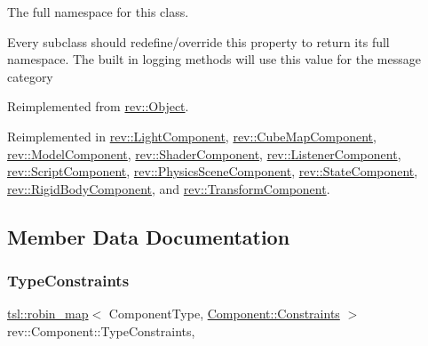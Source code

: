 The full namespace for this class. 

Every subclass should redefine/override this property to return its full namespace. The built in logging methods will use this value for the message category 

Reimplemented from \mbox{\hyperlink{classrev_1_1_object_aaeb638d3e10f361c56c211a318a27f3d}{rev\+::\+Object}}.



Reimplemented in \mbox{\hyperlink{classrev_1_1_light_component_a517a3334919e5cd1aeacdd52c65c90c1}{rev\+::\+Light\+Component}}, \mbox{\hyperlink{classrev_1_1_cube_map_component_a5fd0d5b47d8ba3594d4daf0ed8135b83}{rev\+::\+Cube\+Map\+Component}}, \mbox{\hyperlink{classrev_1_1_model_component_ad55fe767e54742f08b338f0f13498cf8}{rev\+::\+Model\+Component}}, \mbox{\hyperlink{classrev_1_1_shader_component_ac052c16eed35e22f62df1d06cf346d55}{rev\+::\+Shader\+Component}}, \mbox{\hyperlink{classrev_1_1_listener_component_a83f62effee9c503dd7ee0b0322b0057e}{rev\+::\+Listener\+Component}}, \mbox{\hyperlink{classrev_1_1_script_component_a469f8cd22b928cef2b98297b3b0285dd}{rev\+::\+Script\+Component}}, \mbox{\hyperlink{classrev_1_1_physics_scene_component_addd583a06c948a96f86d90937a3c4c8d}{rev\+::\+Physics\+Scene\+Component}}, \mbox{\hyperlink{classrev_1_1_state_component_ae95ec4b4b31544c7b555ff80ac423162}{rev\+::\+State\+Component}}, \mbox{\hyperlink{classrev_1_1_rigid_body_component_ae206ce233b7fffd3781cc37bbfc6e17d}{rev\+::\+Rigid\+Body\+Component}}, and \mbox{\hyperlink{classrev_1_1_transform_component_a7dc2abcb1d759a29c28fc8ceb632a31d}{rev\+::\+Transform\+Component}}.



\subsection{Member Data Documentation}
\mbox{\label{classrev_1_1_component_ace286070097cd9f3e3594105613c36a3}} 
\subsubsection{\texorpdfstring{TypeConstraints}{TypeConstraints}}
{\footnotesize\ttfamily \mbox{\hyperlink{classtsl_1_1robin__map}{tsl\+::robin\+\_\+map}}$<$ Component\+Type, \mbox{\hyperlink{structrev_1_1_component_1_1_constraints}{Component\+::\+Constraints}} $>$ rev\+::\+Component\+::\+Type\+Constraints\hspace{0.3cm}{\ttfamily [static]}, {\ttfamily [protected]}}

